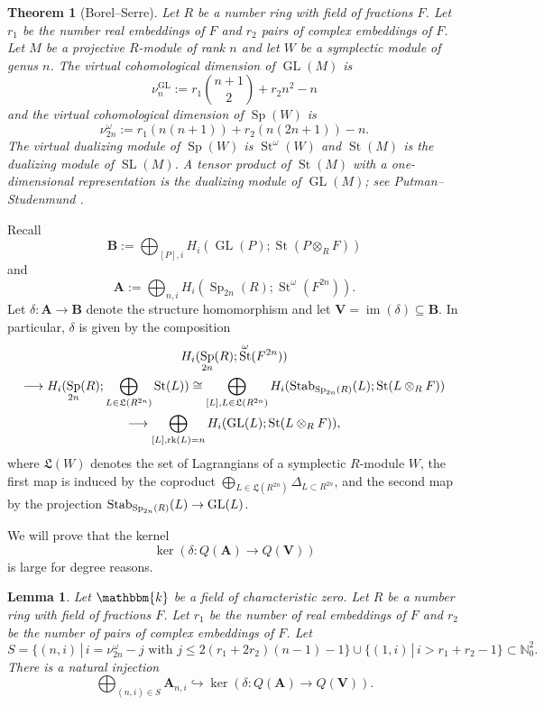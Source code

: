 \documentclass[11pt,letterpaper]{amsart}
\newcommand{\bk}{\mathbbm{k}}
\DeclareMathOperator{\Sp}{Sp}
\newcommand{\VV}{\mathbf{V}}
\newcommand{\HH}{\mathbf{B}}
\newcommand{\HA}{\mathbf{A}}
\newcommand{\fL}{\mathfrak{L}}
\newcommand{\N}{\mathbb{N}_0}
\numberwithin{theoremcounter}{section}
\newtheorem{theorem}[theoremauto]{Theorem}
\newtheorem{lemma}[lemmaauto]{Lemma}
\theoremstyle{definition}
\theoremstyle{remark}
\newcommand{\mr}[1]{{\rm #1}}
\newcommand{\Stab}{\mr{Stab}}
\DeclareMathOperator{\rk}{rk}
\DeclareMathOperator{\GL}{GL}
\DeclareMathOperator{\SL}{SL}
\DeclareMathOperator{\St}{St}
\DeclareMathOperator{\im}{im}
\begin{document}
\begin{theorem}[Borel--Serre] \label{BSduality} Let $R$ be a number ring with field of fractions $F$. Let $r_1$ be the number real embeddings of $F$ and $r_2$ pairs of complex embeddings of $F$. Let $M$ be a projective $R$-module of rank $n$ and let $W$ be a symplectic module of genus $n$. The virtual cohomological dimension of $\GL(M)$ is $$\nu^{\GL}_n :=r_1 {{n+1} \choose 2} +r_2 n^2 -n$$ and the virtual cohomological dimension of $\Sp(W)$ is $$\nu_{2n}^\omega:= r_1 (n(n+1))+r_2(n(2n+1))-n.$$ The virtual dualizing module of $\Sp(W)$ is $\St^\omega(W)$ and $\St(M)$ is the dualizing module of $\SL(M)$. A tensor product of $\St(M)$ with a one-dimensional representation is the dualizing module of $\GL(M)$; see 
  Putman--Studenmund \cite[Theorem C]{PutStu}.
\end{theorem}
Recall 
$$\HH :=\bigoplus_{[P],i} H_i(\GL(P);\St(P \otimes_R F))$$ and 
$$\HA :=\bigoplus_{n,i } H_i(\Sp_{2n}(R);\St^\omega(F^{2n})).$$ 
 Let $\delta\colon\HA \to \HH$ denote the structure homomorphism 
 and let  $\VV=\im(\delta) \subseteq \HH$. In particular, $\delta$ is given by the composition %
 \begin{multline*} H_i(\Sp_{2n}(R); \St^\omega(F^{2n})) \\\longrightarrow H_i(\Sp_{2n}(R); \bigoplus_{L\in \fL(R^{2n})} \St(L)) \cong \bigoplus_{[L], L\in \fL(R^{2n})} H_i(\Stab_{\Sp_{2n}(R)}(L);\St(L \otimes_R F)) \\\longrightarrow \bigoplus_{[L], \rk(L) = n}H_i(\GL(L);\St(L \otimes_R F)) , \end{multline*}
where $\fL(W)$ denotes the set of Lagrangians of a symplectic $R$-module $W$, the first map is induced by the coproduct $\bigoplus_{L \in \fL(R^{2n})}\Delta_{L\subset R^{2n}}$, and the second map by the projection $\Stab_{\Sp_{2n}(R)}(L) \to \GL(L)$.


We will prove that the kernel $$\ker(\delta\colon Q(\HA) \to Q(\VV))$$ is large for degree reasons. 

\begin{lemma} \label{sourceofindecomposables} Let $\bk$ be a field of characteristic zero. Let $R$ be a number ring with field of fractions $F$. Let $r_1$ be the number of real embeddings of $F$ and $r_2$ be the number of pairs of complex embeddings of $F$. Let 
$$S=\{(n,i) \,| \, i= \nu_{2n}^{\omega} -j \text{ with } j \leq 2(r_1+2r_2)(n-1)-1 \} \cup \{(1,i) \, | \, i > r_1+r_2-1  \} \subset \N^2.$$ 
    There is a natural injection $$\bigoplus_{(n,i) \in S} \HA_{n,i} \hookrightarrow  \ker(\delta\colon Q(\HA) \to Q(\VV)).$$ 
\end{lemma}
\end{document}
